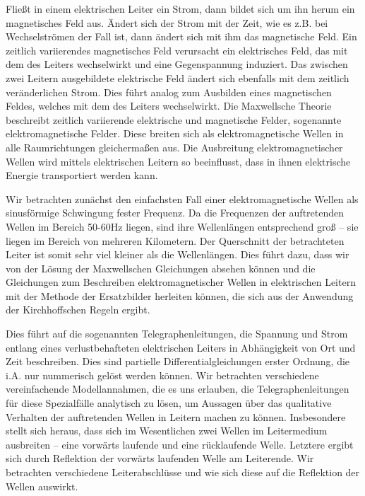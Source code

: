 \documentclass[paper=a4, parskip=half-, ngerman, fontsize=11pt]{scrreprt}
\begin{document}
Fließt in einem elektrischen Leiter ein Strom, dann bildet sich um ihn herum ein magnetisches Feld aus. Ändert sich der
Strom mit der Zeit, wie es z.B. bei Wechselströmen der Fall ist, dann ändert sich mit ihm das magnetische Feld. Ein
zeitlich variierendes magnetisches Feld verursacht ein elektrisches Feld, das mit dem des Leiters wechselwirkt und
eine  Gegenspannung induziert. Das zwischen zwei Leitern ausgebildete elektrische Feld ändert sich ebenfalls mit dem
zeitlich veränderlichen Strom. Dies führt analog zum Ausbilden eines magnetischen Feldes, welches mit dem des Leiters
wechselwirkt. Die Maxwellsche Theorie beschreibt zeitlich variierende elektrische und magnetische Felder, sogenannte
elektromagnetische Felder. Diese breiten sich als elektromagnetische Wellen in alle Raumrichtungen gleichermaßen aus.
Die Ausbreitung elektromagnetischer Wellen wird mittels elektrischen Leitern so beeinflusst, dass in ihnen elektrische
Energie transportiert werden kann.

Wir betrachten zunächst den einfachsten Fall einer elektromagnetische Wellen als sinusförmige Schwingung fester
Frequenz. Da die Frequenzen der auftretenden Wellen im Bereich 50-60Hz liegen, sind ihre Wellenlängen entsprechend groß
-- sie liegen im Bereich von mehreren Kilometern. Der Querschnitt der betrachteten Leiter ist somit sehr viel kleiner
als die Wellenlängen. Dies führt dazu, dass wir von der Lösung der Maxwellschen Gleichungen absehen können und die
Gleichungen zum Beschreiben elektromagnetischer Wellen in elektrischen Leitern mit der Methode der Ersatzbilder
herleiten können, die sich aus der Anwendung der Kirchhoffschen Regeln ergibt.

Dies führt auf die sogenannten Telegraphenleitungen, die Spannung und Strom entlang eines verlustbehafteten
elektrischen Leiters in Abhängigkeit von Ort und Zeit beschreiben. Dies sind partielle Differentialgleichungen erster
Ordnung, die i.A. nur nummerisch gelöst werden können. Wir betrachten verschiedene vereinfachende Modellannahmen, die
es uns erlauben, die Telegraphenleitungen für diese Spezialfälle analytisch zu lösen, um Aussagen über das qualitative
Verhalten der auftretenden Wellen in Leitern machen zu können. Insbesondere stellt sich heraus, dass sich im
Wesentlichen zwei Wellen im Leitermedium ausbreiten -- eine vorwärts laufende und eine rücklaufende Welle. Letztere
ergibt sich durch Reflektion der vorwärts laufenden Welle am Leiterende. Wir betrachten verschiedene Leiterabschlüsse
und wie sich diese auf die Reflektion der Wellen auswirkt.
\end{document}
